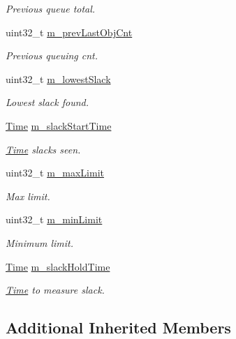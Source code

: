 \begin{DoxyCompactItemize}
\begin{DoxyCompactList}\small\item\em Previous queue total. \end{DoxyCompactList}\item 
uint32\+\_\+t \hyperlink{classns3_1_1DynamicQueueLimits_aa0575ebe24da604189c82e32df9882e3}{m\+\_\+prev\+Last\+Obj\+Cnt}
\begin{DoxyCompactList}\small\item\em Previous queuing cnt. \end{DoxyCompactList}\item 
uint32\+\_\+t \hyperlink{classns3_1_1DynamicQueueLimits_ab47105c4df36adf2512a8fbc3fd4da4d}{m\+\_\+lowest\+Slack}
\begin{DoxyCompactList}\small\item\em Lowest slack found. \end{DoxyCompactList}\item 
\hyperlink{classns3_1_1Time}{Time} \hyperlink{classns3_1_1DynamicQueueLimits_a4e63a333752db6ccdaa6c232c4f5433b}{m\+\_\+slack\+Start\+Time}
\begin{DoxyCompactList}\small\item\em \hyperlink{classns3_1_1Time}{Time} slacks seen. \end{DoxyCompactList}\item 
uint32\+\_\+t \hyperlink{classns3_1_1DynamicQueueLimits_af4720582bb5b333dad967863d250e868}{m\+\_\+max\+Limit}
\begin{DoxyCompactList}\small\item\em Max limit. \end{DoxyCompactList}\item 
uint32\+\_\+t \hyperlink{classns3_1_1DynamicQueueLimits_a6717698410fa64928d9c41108974ea66}{m\+\_\+min\+Limit}
\begin{DoxyCompactList}\small\item\em Minimum limit. \end{DoxyCompactList}\item 
\hyperlink{classns3_1_1Time}{Time} \hyperlink{classns3_1_1DynamicQueueLimits_a788650e71ce18f137b3620a8659eeda3}{m\+\_\+slack\+Hold\+Time}
\begin{DoxyCompactList}\small\item\em \hyperlink{classns3_1_1Time}{Time} to measure slack. \end{DoxyCompactList}\end{DoxyCompactItemize}
\subsection*{Additional Inherited Members}


